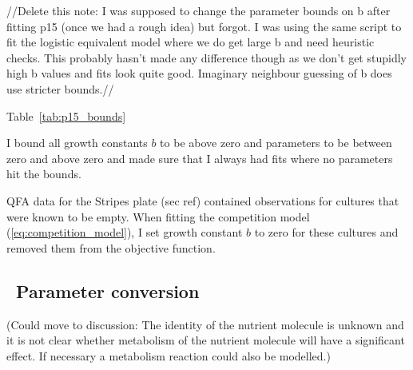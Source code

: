 //Delete this note: I was supposed to change the parameter bounds on b
after fitting p15 (once we had a rough idea) but forgot. I was using
the same script to fit the logistic equivalent model where we do get
large b and need heuristic checks. This probably hasn't made any
difference though as we don't get stupidly high b values and fits look
quite good. Imaginary neighbour guessing of b does use stricter
bounds.//

Table~\ref{tab:p15_bounds}


I bound all growth constants \(b\) to be above zero and  parameters to
be between zero and  above zero and made sure that I always had fits where no parameters
hit the bounds.





QFA data for the Stripes plate (sec ref) contained observations for
cultures that were known to be empty. When fitting the competition
model (\ref{eq:competition_model}), I set growth constant \(b\) to
zero for these cultures and removed them from the objective function.





\subsection{\thesubsection~Parameter conversion}

(Could move to discussion: The identity of the
nutrient molecule is unknown and it is not clear whether metabolism of
the nutrient molecule will have a significant effect. If necessary a
metabolism reaction could also be modelled.)\\

